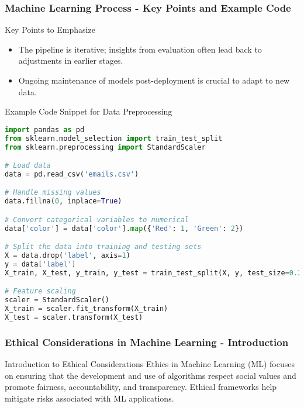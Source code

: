 \documentclass[aspectratio=169]{beamer}
\begin{document}
\begin{frame}[fragile]
  \frametitle{Machine Learning Process - Key Points and Example Code}
  \begin{block}{Key Points to Emphasize}
    \begin{itemize}
      \item The pipeline is iterative; insights from evaluation often lead back to adjustments in earlier stages.
      \item Ongoing maintenance of models post-deployment is crucial to adapt to new data.
    \end{itemize}
  \end{block}
  
  \begin{block}{Example Code Snippet for Data Preprocessing}
    \begin{lstlisting}[language=Python]
import pandas as pd
from sklearn.model_selection import train_test_split
from sklearn.preprocessing import StandardScaler

# Load data
data = pd.read_csv('emails.csv')

# Handle missing values
data.fillna(0, inplace=True)

# Convert categorical variables to numerical
data['color'] = data['color'].map({'Red': 1, 'Green': 2})

# Split the data into training and testing sets
X = data.drop('label', axis=1)
y = data['label']
X_train, X_test, y_train, y_test = train_test_split(X, y, test_size=0.2, random_state=42)

# Feature scaling
scaler = StandardScaler()
X_train = scaler.fit_transform(X_train)
X_test = scaler.transform(X_test)
    \end{lstlisting}
  \end{block}
\end{frame}

\begin{frame}[fragile]
    \frametitle{Ethical Considerations in Machine Learning - Introduction}
    \begin{block}{Introduction to Ethical Considerations}
        Ethics in Machine Learning (ML) focuses on ensuring that the development and use of algorithms respect social values and promote fairness, accountability, and transparency. Ethical frameworks help mitigate risks associated with ML applications.
    \end{block}
\end{frame}
\end{document}
